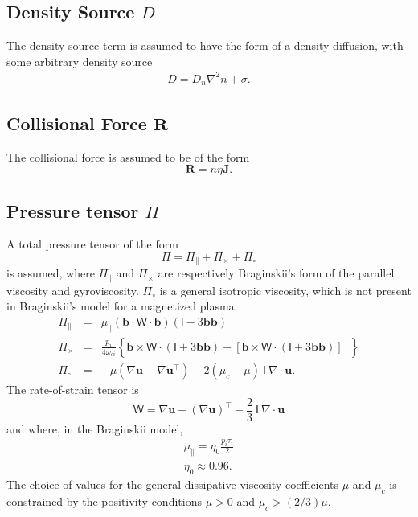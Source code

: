 \documentclass[letterpaper]{book}
\renewcommand{\vec}[1]{\ensuremath{\mathbf{#1}}}
\newcommand{\tensor}[1]{\mathsf{#1}}
\newcommand{\R}{\vec{R}}
\renewcommand{\u}{\vec{u}}
\renewcommand{\j}{\vec{J}}
\renewcommand{\P}{\tensor{\Pi}}
\renewcommand{\b}{\vec{b}}
\newcommand{\W}{\tensor{W}}
\newcommand{\grad}[1]{\nabla #1}
\renewcommand{\div}[1]{\nabla \cdot #1}
\begin{document}
\subsection{Density Source $D$}

The density source term is assumed to have the form of a density
diffusion, with some arbitrary density source
\begin{eqnarray}
  D = D_n \nabla^2 n + \sigma.
\end{eqnarray}


\subsection{Collisional Force $\R$}

The collisional force is assumed to be of the form
\begin{equation}
  \label{eq:collisional_force}
  \R = n \eta \j.
\end{equation}


\subsection{Pressure tensor $\P$ \label{sec:pressure_tensor}}
A total pressure tensor of the form
\begin{equation}
  \P = \P_\parallel + \P_\times + \P_\circ
\end{equation}
is assumed, where $\P_\parallel$ and $\P_\times$ are respectively
Braginskii's form of the parallel viscosity and gyroviscosity.
$\P_\circ$ is a general isotropic viscosity, which is not present in
Braginskii's model for a magnetized plasma.
\begin{eqnarray}
  \label{eq:parallel_viscosity}
  \P_\parallel & = & \mu_\parallel   \left( \b \cdot \W \cdot \b \right)
  \left( \tensor{I} - 3 \b \b \right)
  \\
  \label{eq:gyroviscosity}
  \P_\times & = & \frac{p_i}{4 \omega_{c i}} \left\{
    \b \times \W \cdot (\tensor{I} + 3 \b\b) +
    \left[\b \times \W \cdot (\tensor{I} + 3 \b\b)\right]^\top
    \right\}
  \\
  \label{eq:general_viscosity}
  \P_\circ & = & -\mu \left(\grad{\u} + \grad{\u}^\top\right)
   -2 \left(\mu_c - \mu \right)\ \tensor{I}\ \div{\u}.
\end{eqnarray}
The rate-of-strain tensor is
\begin{displaymath}
  \W = \nabla \u + (\nabla \u)^\top 
  - \frac{2}{3}\ \tensor{I}\ \div{\u}
\end{displaymath}
and where, in the Braginskii model,
\begin{eqnarray*}
  \mu_\parallel = \eta_0 \frac{p_i \tau_i}{2} 
  \\
  \eta_0 \approx 0.96.  
\end{eqnarray*}
The choice of values for the general dissipative viscosity
coefficients $\mu$ and $\mu_c$ is constrained by the positivity
conditions $\mu > 0$ and $\mu_c > (2/3)\mu$.
\end{document}
